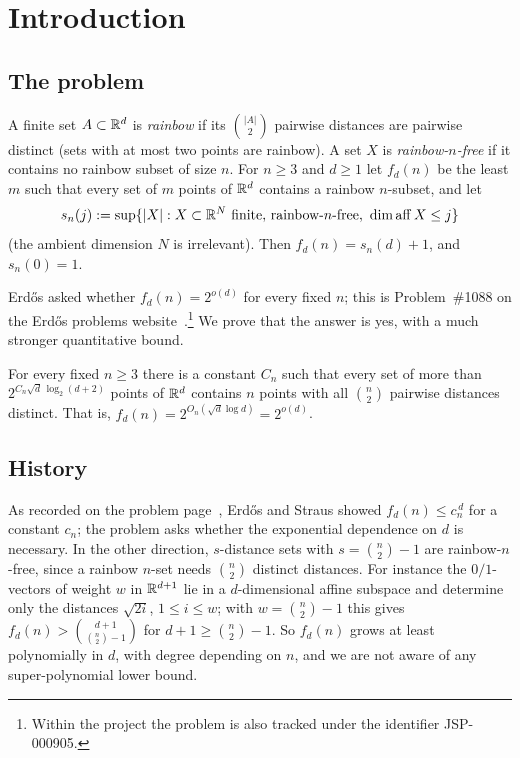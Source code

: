 \section{Introduction}\label{sec:intro}

\subsection{The problem}
A finite set $A\subset\mathbb{R}^d$ is \emph{rainbow} if its $\binom{|A|}{2}$ pairwise distances are pairwise distinct
(sets with at most two points are rainbow). A set $X$ is \emph{rainbow-$n$-free} if it contains no rainbow
subset of size $n$. For $n\ge 3$ and $d\ge 1$ let $f_d(n)$ be the least $m$ such that every set of $m$ points of
$\mathbb{R}^d$ contains a rainbow $n$-subset, and let
\[
  s_n(j):=\sup\{|X| : X\subset\mathbb{R}^{N}\text{ finite, rainbow-$n$-free, } \dim\operatorname{aff} X\le j\}
\]
(the ambient dimension $N$ is irrelevant). Then $f_d(n)=s_n(d)+1$, and $s_n(0)=1$.

Erd\H{o}s asked whether $f_d(n)=2^{o(d)}$ for every fixed $n$; this is Problem~\#1088 on the
Erd\H{o}s problems website~\cite{EP1088}.\footnote{Within the project the problem is also tracked under
the identifier JSP-000905.} We prove that the answer is yes, with a much stronger quantitative bound.

\begin{theorem}\label{thm:main-intro}
For every fixed $n\ge 3$ there is a constant $C_n$ such that every set of more than
$2^{C_n\sqrt d\,\log_2(d+2)}$ points of $\mathbb{R}^d$ contains $n$ points with all $\binom n2$ pairwise distances
distinct. That is, $f_d(n)=2^{O_n(\sqrt d\log d)}=2^{o(d)}$.
\end{theorem}

\subsection{History}
As recorded on the problem page~\cite{EP1088}, Erd\H{o}s and Straus showed $f_d(n)\le c_n^{\,d}$ for a constant
$c_n$; the problem asks whether the exponential dependence on $d$ is necessary. In the other direction,
$s$-distance sets with $s=\binom n2-1$ are rainbow-$n$-free, since a rainbow $n$-set needs $\binom n2$ distinct
distances. For instance the $0/1$-vectors of weight $w$ in $\mathbb{R}^{d+1}$ lie in a $d$-dimensional affine subspace
and determine only the distances $\sqrt{2i}$, $1\le i\le w$; with $w=\binom n2-1$ this gives
$f_d(n)>\binom{d+1}{\binom n2-1}$ for $d+1\ge \binom n2 -1$. So $f_d(n)$ grows at least polynomially in $d$, with
degree depending on $n$, and we are not aware of any super-polynomial lower bound.

